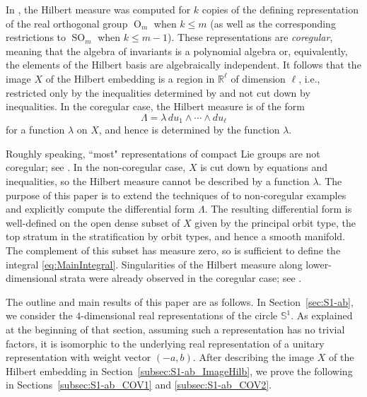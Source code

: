 \documentclass[twoside]{amsart}
\theoremstyle{definition}
\theoremstyle{remark}
\numberwithin{equation}{section}
\newcommand{\Sp}{\mathbb{S}}
\newcommand{\R}{\mathbb{R}}
\newcommand{\OO}{\operatorname{O}}
\newcommand{\SO}{\operatorname{SO}}
\begin{document}
In \cite{HerbigSeatonWhitesell}, the Hilbert measure was computed for $k$ copies of the defining representation of the real orthogonal group
$\OO_m$ when $k\leq m$ (as well as the corresponding restrictions to $\SO_m$ when $k\leq m-1$). These representations are \emph{coregular},
meaning that the algebra of invariants is a polynomial algebra or, equivalently, the elements of the Hilbert basis are algebraically independent.
It follows that the image $X$ of the Hilbert embedding is a region in $\R^\ell$ of dimension $\ell$, i.e., restricted only by the inequalities determined
by \cite[Thrm.~0.10]{ProcesiSchwarz} and not cut down by inequalities. In the coregular case, the Hilbert measure is of the form
\[
    \Lambda
    =   \lambda \, du_1 \wedge \cdots \wedge du_\ell
\]
for a function $\lambda$ on $X$, and hence is determined by the function $\lambda$.

Roughly speaking, ``most" representations of compact Lie groups are not coregular; see
\cite{AdamovichGolovina,KacPopovVinbergLibre,LittelmannKoregulaere,GWSSimpleRegularRingsInvars}.
In the non-coregular case, $X$ is cut down by equations and inequalities, so the Hilbert measure cannot be described by a function $\lambda$.
The purpose of this paper is to extend the techniques of \cite{HerbigSeatonWhitesell} to non-coregular examples and explicitly compute
the differential form $\Lambda$. The resulting differential form is well-defined on the open dense subset of $X$ given by the principal
orbit type, the top stratum in the stratification by orbit types, and hence a smooth manifold. The complement of this subset has measure zero,
so is sufficient to define the integral \eqref{eq:MainIntegral}. Singularities of the Hilbert measure along lower-dimensional strata were
already observed in the coregular case; see \cite[pp.~3]{HerbigSeatonWhitesell}.

The outline and main results of this paper are as follows. In Section~\ref{sec:S1-ab},
we consider the $4$-dimensional real representations of the circle $\Sp^1$. As explained at the beginning of that section,
assuming such a representation has no trivial factors, it is isomorphic to the underlying real representation of a unitary representation
with weight vector $(-a,b)$. After describing the image $X$ of the Hilbert embedding in Section~\ref{subsec:S1-ab_ImageHilb}, we prove the following
in Sections~\ref{subsec:S1-ab_COV1} and \ref{subsec:S1-ab_COV2}.
\end{document}
